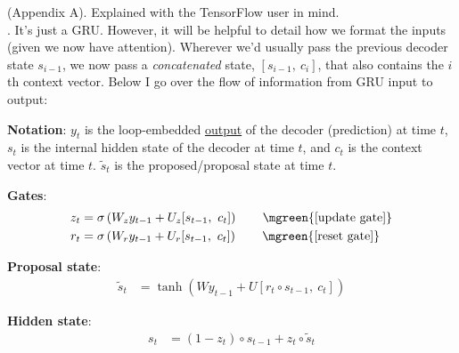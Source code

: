 \documentclass[11pt]{article}
\begin{document}
\myspace
{}

(Appendix A). Explained with the TensorFlow user in mind.\\

\myspace
\p {}. It's just a GRU. However, it will be helpful to detail how we format the inputs (given we now have attention). Wherever we'd usually pass the previous decoder state $s_{i - 1}$, we now pass a \textit{concatenated} state, $[s_{i - 1},~ c_i]$, that also contains the $i$th context vector. Below I go over the flow of information from GRU input to output:
\begin{compactenum}
	\item \textbf{Notation}: $y_t$ is the loop-embedded \underline{output} of the decoder (prediction) at time $t$, $s_t$ is the internal hidden state of the decoder at time $t$, and $c_t$ is the context vector at time $t$. $\tilde s_t$ is the proposed/proposal state at time $t$.
	\item \textbf{Gates}:
	\begin{align}
	z_t &= \sigma\left( W_z y_{t - 1} + U_z [s_{t - 1},~ c_t] \right)
	\qquad \mgreen{\text{[update gate]}} \\
	r_t &= \sigma\left( W_r y_{t - 1} + U_r [s_{t - 1},~ c_t] \right)
	\qquad \mgreen{\text{[reset gate]}} \\
	\end{align}
	
	\item \textbf{Proposal state}:
	\begin{align}
	\tilde s_t &= \tanh\left( W y_{t - 1} + U [r_t \circ s_{t - 1}, ~ c_t]  \right)
	\end{align}
	
	\item \textbf{Hidden state}:
	\begin{align}
	s_t &= (1 - z_t) \circ s_{t - 1} + z_t \circ \tilde s_t
	\end{align}
	
\end{compactenum}
\end{document}
